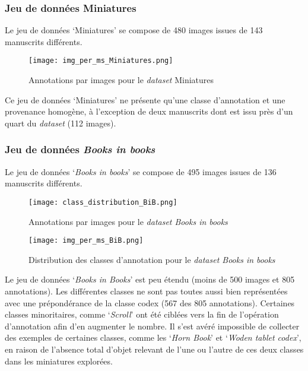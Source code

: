 \documentclass[12pt,twoside]{book}
\begin{document}
\subsubsection{Jeu de données Miniatures}

Le jeu de données ‘Miniatures’ se compose de 480 images issues de 143 manuscrits différents.

\begin{figure}[ht]
    \centering
    \begin{minipage}[b]{0.45\textwidth}
        \centering
        \texttt{[image: img\_per\_ms\_Miniatures.png]}
        \caption{Annotations par images pour le \textit{dataset} Miniatures}
    \end{minipage}
\end{figure}

Ce jeu de données ‘Miniatures’ ne présente qu’une classe d’annotation et une provenance homogène, à l’exception de deux manuscrits dont est issu près d’un quart du\textit{ dataset} (112 images).

\newpage
\subsubsection{Jeu de données \textit{Books in books}}

Le jeu de données ‘\textit{Books in books}’ se compose de 495 images issues de 136 manuscrits différents.

\begin{figure}[ht]
    \centering
    \begin{minipage}[b]{0.45\textwidth}
        \centering
        \texttt{[image: class\_distribution\_BiB.png]}
        \caption{Annotations par images pour le \textit{dataset Books in books}}
    \end{minipage}
    \hfill
    \begin{minipage}[b]{0.45\textwidth}
        \centering
        \texttt{[image: img\_per\_ms\_BiB.png]}
        \caption{Distribution des classes d'annotation pour le \textit{dataset Books in books}}
    \end{minipage}
\end{figure}

Le jeu de données ‘\textit{Books in Books}’ est peu étendu (moins de 500 images et 805 annotations). Les différentes classes ne sont pas toutes aussi bien représentées avec une prépondérance de la classe codex (567 des 805 annotations). Certaines classes minoritaires, comme ‘\textit{Scroll}’ ont été ciblées vers la fin de l'opération d'annotation afin d'en augmenter le nombre. Il s'est avéré impossible de collecter des exemples de certaines classes, comme les ‘\textit{Horn Book}’ et ‘\textit{Woden tablet codex}’, en raison de l'absence total d’objet relevant de l’une ou l’autre de ces deux classes dans les miniatures explorées. 
\end{document}
